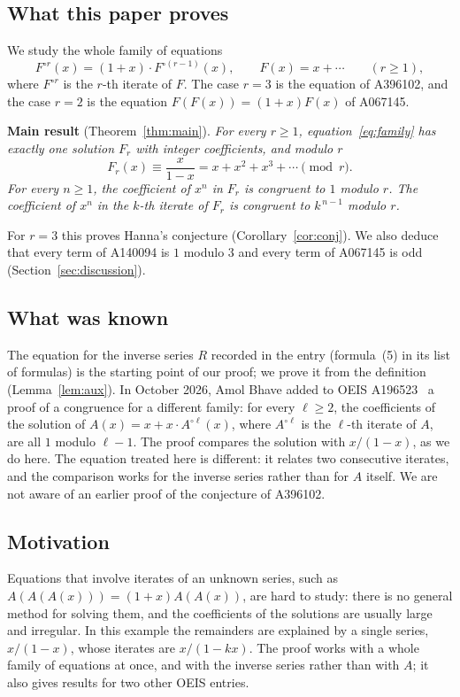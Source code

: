 \documentclass[11pt,a4paper]{article}
\theoremstyle{definition}
\theoremstyle{remark}
\begin{document}
\subsection{What this paper proves}
We study the whole family of equations
\begin{equation}\label{eq:family}
F^{\circ r}(x)=(1+x)\cdot F^{\circ(r-1)}(x),\qquad F(x)=x+\cdots\qquad(r\ge1),
\end{equation}
where $F^{\circ r}$ is the $r$-th iterate of $F$. The case $r=3$ is the equation of A396102, and the case $r=2$ is the
equation $F(F(x))=(1+x)F(x)$ of A067145.

\textbf{Main result} (Theorem~\ref{thm:main}). \emph{For every $r\ge1$, equation~\eqref{eq:family} has exactly one
solution $F_r$ with integer coefficients, and modulo $r$}
\[
F_r(x)\equiv\frac{x}{1-x}=x+x^2+x^3+\cdots\pmod r .
\]
\emph{For every $n\ge1$, the coefficient of $x^n$ in $F_r$ is congruent to $1$ modulo $r$.
The coefficient of $x^n$ in the $k$-th iterate of $F_r$ is congruent to $k^{\,n-1}$ modulo $r$.}

For $r=3$ this proves Hanna's conjecture (Corollary~\ref{cor:conj}). We also deduce that every term of A140094 is
$1$ modulo $3$ and every term of A067145 is odd (Section~\ref{sec:discussion}).

\subsection{What was known}
The equation for the inverse series $R$ recorded in the entry (formula~(5) in its list of formulas) is the starting point of our proof; we
prove it from the definition (Lemma~\ref{lem:aux}). In October 2026, Amol Bhave added to OEIS A196523~\cite{oeisB} a
proof of a congruence for a different family: for every $\ell\ge2$, the coefficients of the solution of
$A(x)=x+x\cdot A^{\circ\ell}(x)$, where $A^{\circ\ell}$ is the $\ell$-th iterate of $A$, are all $1$ modulo $\ell-1$. The
proof compares the solution with $x/(1-x)$, as we do here. The equation treated here is different: it relates two
consecutive iterates, and the
comparison works for the inverse series rather than for $A$ itself. We are not aware of an earlier proof of the
conjecture of A396102.

\subsection{Motivation}
Equations that involve iterates of an unknown series, such as $A(A(A(x)))=(1+x)A(A(x))$, are hard to study: there is
no general method for solving them, and the coefficients of the solutions are usually large and irregular. In this
example the remainders are explained by a single series, $x/(1-x)$, whose iterates are $x/(1-kx)$. The proof works with
a whole family of equations at once, and with the inverse series rather than with $A$; it also gives results for two
other OEIS entries.
\end{document}
